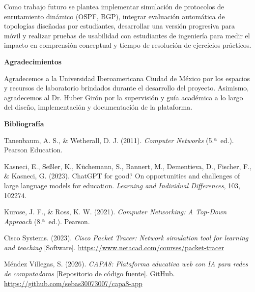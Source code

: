 \documentclass[12pt,letterpaper]{article}
\begin{document}
Como trabajo futuro se plantea implementar simulación de protocolos de enrutamiento dinámico (OSPF, BGP), integrar evaluación automática de topologías diseñadas por estudiantes, desarrollar una versión progresiva para móvil y realizar pruebas de usabilidad con estudiantes de ingeniería para medir el impacto en comprensión conceptual y tiempo de resolución de ejercicios prácticos.

\textbf{Agradecimientos}

Agradecemos a la Universidad Iberoamericana Ciudad de México por los espacios y recursos de laboratorio brindados durante el desarrollo del proyecto. Asimismo, agradecemos al Dr. Huber Girón por la supervisión y guía académica a lo largo del diseño, implementación y documentación de la plataforma.

\textbf{Bibliografía}

Tanenbaum, A. S., \& Wetherall, D. J. (2011). \textit{Computer Networks} (5.ª~ed.). Pearson Education.

Kasneci, E., Seßler, K., Küchemann, S., Bannert, M., Dementieva, D., Fischer, F., \& Kasneci, G. (2023). ChatGPT for good? On opportunities and challenges of large language models for education. \textit{Learning and Individual Differences}, 103, 102274.

Kurose, J. F., \& Ross, K. W. (2021). \textit{Computer Networking: A Top-Down Approach} (8.ª~ed.). Pearson.

Cisco Systems. (2023). \textit{Cisco Packet Tracer: Network simulation tool for learning and teaching} [Software]. \url{https://www.netacad.com/courses/packet-tracer}

Méndez Villegas, S. (2026). \textit{CAPA8: Plataforma educativa web con IA para redes de computadoras} [Repositorio de código fuente]. GitHub. \url{https://github.com/sebas30073007/capa8-app}
\end{document}
